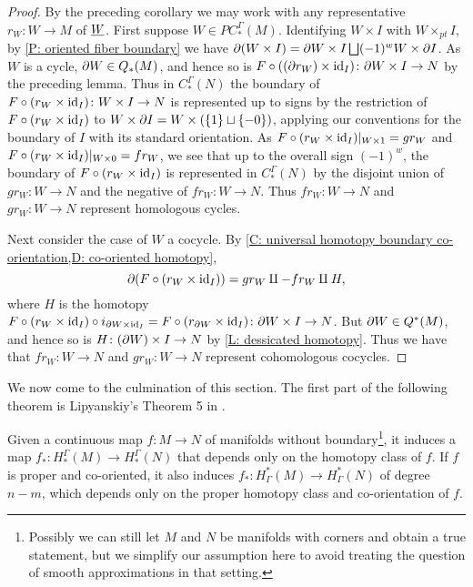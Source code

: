 \begin{proof}
	By the preceding corollary we may work with any representative $r_W \colon W \to M$ of $\underline{W}$.
	First suppose $W \in PC_*^\Gamma(M)$.
	Identifying $W \times I$ with $W \times_{pt} I$, by \cref{P: oriented fiber boundary} we have $\partial (W \times I) = \partial W \times I \bigsqcup (-1)^{w} W \times \partial I$.
	As $W$ is a cycle, $\partial W \in Q_*(M)$, and hence so is $F \circ ((\partial r_W) \times \mathrm{id}_I) \colon \partial W \times I \to N$ by the preceding lemma.
	Thus in $C^\Gamma_*(N)$ the boundary of $F \circ (r_W \times \mathrm{id}_I) \colon W \times I \to N$ is represented up to signs by the restriction of
	$F \circ (r_W \times \mathrm{id}_I)$ to $W \times \partial I = W \times (\{1\} \sqcup \{-0\})$, applying our conventions for the boundary of $I$ with its standard orientation.
	As $F \circ (r_W \times \mathrm{id}_I)|_{W \times 1} = gr_W$ and $F \circ (r_W \times \mathrm{id}_I)|_{W \times 0} = fr_W$, we see that up to the overall sign $(-1)^{w}$, the boundary of $F \circ (r_W \times \mathrm{id}_I)$ is represented in $C_*^\Gamma(N)$ by the disjoint union of $gr_W \colon W \to N$ and the negative of $fr_W \colon W \to N$.
	Thus $fr_W \colon W \to N$ and $gr_W \colon W \to N$ represent homologous cycles.

	Next consider the case of $W$ a cocycle. By \cref{C: universal homotopy boundary co-orientation,D: co-oriented homotopy}, $$\partial (F \circ (r_W \times \mathrm{id}_I)) = gr_W \amalg -fr_W \amalg H,$$ where $H$ is the homotopy $F \circ (r_W \times \mathrm{id}_I) \circ i_{\partial W \times \mathrm{id}_I} = F \circ (r_{\partial W} \times \mathrm{id}_I) \colon \partial W \times I \to N$.
	But $\partial W \in Q^*(M)$, and hence so is $H \colon (\partial W) \times I \to N$ by \cref{L: dessicated homotopy}.
	Thus we have
	that $fr_W \colon W \to N$ and $gr_W \colon W \to N$ represent cohomologous cocycles.
\end{proof}

We now come to the culmination of this section.
The first part of the following theorem is Lipyanskiy's Theorem 5 in \cite{Lipy14}.

\begin{theorem}\label{T: homology homotopy functor}
	Given a \textnormal{continuous} map $f \colon M \to N$ of manifolds without boundary\footnote{Possibly we can still let $M$ and $N$ be manifolds with corners and obtain a true statement, but we simplify our assumption here to avoid treating the question of smooth approximations in that setting.}, it induces a map $f_* \colon H_*^\Gamma(M) \to H_*^\Gamma(N)$ that depends only on the homotopy class of $f$.
	If $f$ is proper and co-oriented, it also induces $f_* \colon H^*_\Gamma(M) \to H^*_\Gamma(N)$ of degree $n-m$, which depends only on the proper homotopy class and co-orientation of $f$.
\end{theorem}

